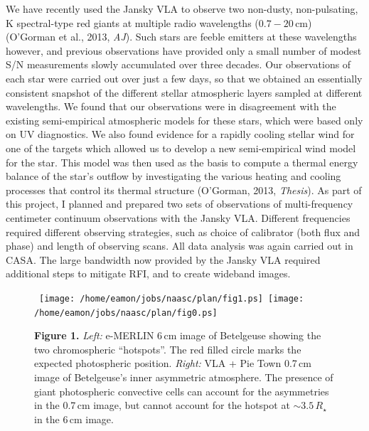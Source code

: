 \documentclass[11pt]{letter} %
\begin{document}
We have recently used the Jansky VLA to observe two non-dusty, non-pulsating, K spectral-type red giants at multiple radio wavelengths ($0.7 - 20$\,cm) (O'Gorman et al., 2013, \textit{AJ}). Such stars are feeble emitters at these wavelengths however, and previous observations have provided only a small number of modest S/N measurements slowly accumulated over three decades. Our observations of each star were carried out over just a few days, so that we obtained an essentially consistent snapshot of the different stellar atmospheric layers sampled at different wavelengths. We found that our observations were in disagreement with the existing semi-empirical atmospheric models for these stars, which were based only on UV diagnostics. We also found evidence for a rapidly cooling stellar wind for one of the targets which allowed us to develop a new semi-empirical wind model for the star. This model was then used as the basis to compute a thermal energy balance of the star's outflow by investigating the various heating and cooling processes that control its thermal structure (O'Gorman, 2013, \textit{Thesis}). As part of this project, I planned and prepared two sets of observations of multi-frequency centimeter continuum observations with the Jansky VLA. Different frequencies required different observing strategies, such as choice of calibrator (both flux and phase) and length of observing scans. All data analysis was again carried out in CASA. The large bandwidth now provided by the Jansky VLA required additional steps to mitigate RFI, and to create wideband images.

\begin{figure}[!ht]
\centering 
\mbox{
          \texttt{[image: /home/eamon/jobs/naasc/plan/fig1.ps]}
          \texttt{[image: /home/eamon/jobs/naasc/plan/fig0.ps]}
          }
\caption{ {\small  \textbf{Figure 1.} \textit{Left:} e-MERLIN 6\,cm image of Betelgeuse showing the two chromospheric ``hotspots''. The red filled circle marks the expected photospheric position. \textit{Right:} VLA + Pie Town 0.7\,cm image of Betelgeuse's inner asymmetric atmosphere. The presence of giant photospheric convective cells can account for the asymmetries in the 0.7\,cm image, but cannot account for the hotspot at $\sim 3.5\,R_{\star}$ in the 6\,cm image.}}
\end{figure}
\end{document}
